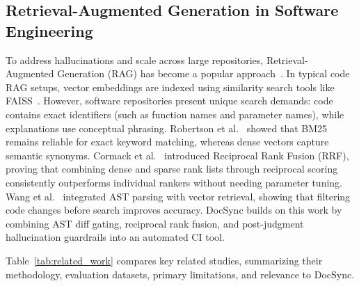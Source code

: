 \documentclass[12pt,onecolumn,draftclsnofoot]{IEEEtran}
\begin{document}
\subsection{Retrieval-Augmented Generation in Software Engineering}
To address hallucinations and scale across large repositories, Retrieval-Augmented Generation (RAG) has become a popular approach~\cite{lewis2020rag}. In typical code RAG setups, vector embeddings are indexed using similarity search tools like FAISS~\cite{johnson2019faiss}. However, software repositories present unique search demands: code contains exact identifiers (such as function names and parameter names), while explanations use conceptual phrasing. Robertson et al.~\cite{robertson2009bm25} showed that BM25 remains reliable for exact keyword matching, whereas dense vectors capture semantic synonyms. Cormack et al.~\cite{cormack2009rrf} introduced Reciprocal Rank Fusion (RRF), proving that combining dense and sparse rank lists through reciprocal scoring consistently outperforms individual rankers without needing parameter tuning. Wang et al.~\cite{wang2024docsync} integrated AST parsing with vector retrieval, showing that filtering code changes before search improves accuracy. DocSync builds on this work by combining AST diff gating, reciprocal rank fusion, and post-judgment hallucination guardrails into an automated CI tool.

Table~\ref{tab:related_work} compares key related studies, summarizing their methodology, evaluation datasets, primary limitations, and relevance to DocSync.
\end{document}

